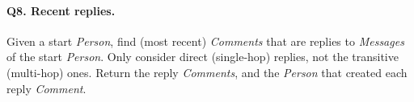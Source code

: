 \paragraph{\textbf{Q8}. Recent replies.}
Given a start \emph{Person}, find (most recent) \emph{Comments} that are
replies to \emph{Messages} of the start \emph{Person}. Only consider
direct (single-hop) replies, not the transitive (multi-hop) ones. Return
the reply \emph{Comments}, and the \emph{Person} that created each reply
\emph{Comment}.
